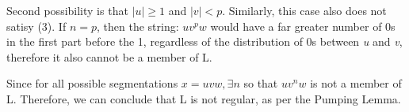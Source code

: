 \documentclass{article}
\begin{document}
Second possibility is that \begin{math} |u| \geq 1 \end{math} and \begin{math} |v| < p \end{math}. Similarly, this case also does not satisy (3).
If \begin{math} n = p \end{math}, then the string: \begin{math} uv^pw \end{math} would have a far greater number of 0s in the first part before the
1, regardless of the distribution of 0s between \textit{u} and \textit{v}, therefore it also cannot be a member of L. \\ \par

Since for all possible segmentations \begin{math} x = uvw, \exists n \end{math} so that 
\begin{math} uv^nw \end{math} is not a member of L. Therefore, we can conclude that L is not regular, as per the Pumping Lemma.
\end{document}
